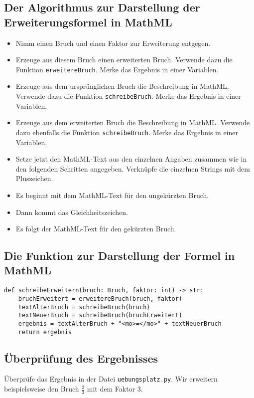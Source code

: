 \subsection*{Der Algorithmus zur Darstellung der Erweiterungsformel in MathML}

\begin{itemize}
	\item Nimm einen Bruch und einen Faktor zur Erweiterung entgegen.
	\item Erzeuge aus diesem Bruch einen erweiterten Bruch. Verwende dazu die Funktion \texttt{erweitereBruch}. Merke das Ergebnis in einer Variablen.
	\item Erzeuge aus dem ursprünglichen Bruch die Beschreibung in MathML. Verwende dazu die Funktion \texttt{schreibeBruch}. Merke das Ergebnis in einer Variablen.
	\item Erzeuge aus dem erweiterten Bruch die Beschreibung in MathML. Verwende dazu ebenfalls die Funktion \texttt{schreibeBruch}. Merke das Ergebnis in einer Variablen.
	\item Setze jetzt den MathML-Text aus den einzelnen Angaben zusammen wie in den folgenden Schritten angegeben. Verknüpfe die einzelnen Strings mit dem Pluszeichen.
	\item Es beginnt mit dem MathML-Text für den ungekürzten Bruch.
	\item Dann kommt das Gleichheitszeichen.
	\item Es folgt der MathML-Text für den gekürzten Bruch.
\end{itemize}

\subsection*{Die Funktion zur Darstellung der Formel in MathML}

\lstset{style=syntaxPython}
\begin{lstlisting}
def schreibeErweitern(bruch: Bruch, faktor: int) -> str:
	bruchErweitert = erweitereBruch(bruch, faktor)
	textAlterBruch = schreibeBruch(bruch)
	textNeuerBruch = schreibeBruch(bruchErweitert)
	ergebnis = textAlterBruch + "<mo>=</mo>" + textNeuerBruch
	return ergebnis
\end{lstlisting}

\subsection*{Überprüfung des Ergebnisses}

Überprüfe das Ergebnis in der Datei \texttt{uebungsplatz.py}. Wir erweitern beispielsweise den Bruch $\frac{2}{3}$ mit dem Faktor 3.

